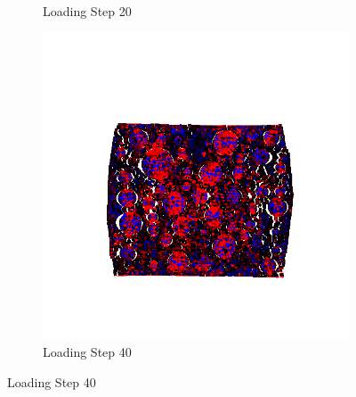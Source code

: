 \begin{figure}[ht]
\begin{subfigure}{.33\textwidth}
      \caption{Loading Step 20}
      \end{subfigure}%
      \begin{subfigure}{.33\textwidth}
        \centering
        \includegraphics[width=1.0\linewidth]{Files/A30P75_3_IS/DEP50-STEP(060).png}
        \caption{Loading Step 40}
      \end{subfigure}


\end{figure}

